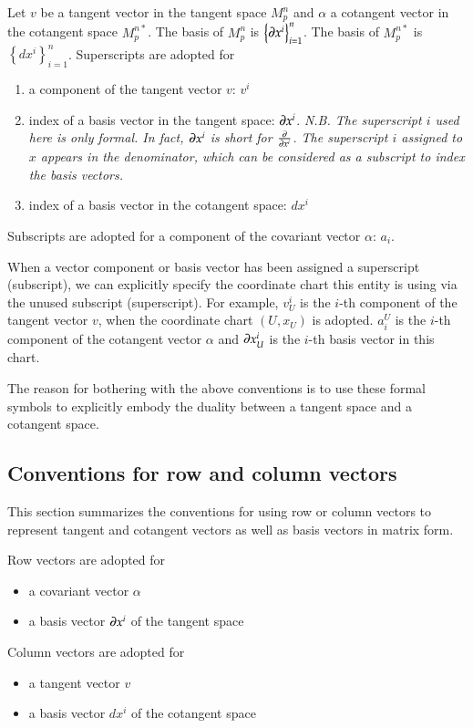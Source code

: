 \documentclass[11pt, a4paper]{book}
\begin{document}
Let $v$ be a tangent vector in the tangent space $M_p^n$ and $\alpha$ a cotangent vector
in the cotangent space $M_p^{n*}$. The basis of $M_p^n$ is
$\left\{ \boldsymbol{\partial}x^i \right\}_{i=1}^n$. The basis of $M_p^{n*}$ is
$\left\{ dx^i \right\}_{i=1}^n$. Superscripts are adopted for
\begin{enumerate}
\item a component of the tangent vector $v$: $v^i$
\item index of a basis vector in the tangent space: $\boldsymbol{\partial}x^i$. \emph{N.B. The
    superscript $i$ used here is only formal. In fact, $\boldsymbol{\partial}x^i$ is short for
    $\frac{\partial}{\partial x^i}$. The superscript $i$ assigned to $x$ appears in the
    denominator, which can be considered as a subscript to index the basis vectors.}
\item index of a basis vector in the cotangent space: $dx^i$
\end{enumerate}
Subscripts are adopted for a component of the covariant vector $\alpha$: $a_i$.

When a vector component or basis vector has been assigned a superscript (subscript), we
can explicitly specify the coordinate chart this entity is using via the unused subscript
(superscript). For example, $v_U^{i}$ is the $i$-th component of the tangent vector $v$,
when the coordinate chart $(U,x_U)$ is adopted. $a_i^U$ is the $i$-th component of the
cotangent vector $\alpha$ and $\boldsymbol{\partial}x_U^i$ is the $i$-th basis vector in this
chart.

The reason for bothering with the above conventions is to use these formal symbols to
explicitly embody the duality between a tangent space and a cotangent space.

\subsection{Conventions for row and column vectors}

This section summarizes the conventions for using row or column vectors to represent
tangent and cotangent vectors as well as basis vectors in matrix form.

Row vectors are adopted for
\begin{itemize}
\item a covariant vector $\alpha$
\item a basis vector $\boldsymbol{\partial}x^i$ of the tangent space
\end{itemize}
Column vectors are adopted for
\begin{itemize}
\item a tangent vector $v$
\item a basis vector $dx^i$ of the cotangent space
\end{itemize}
\end{document}
